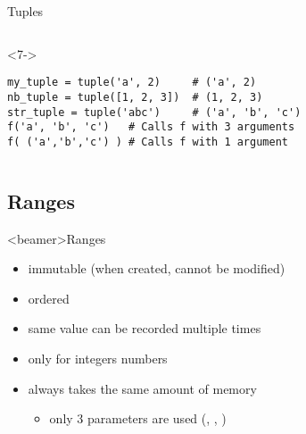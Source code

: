 \begin{frame}[fragile]{Tuples}
\begin{center}
\begin{columns}[onlytextwidth]
\begin{column}{\textwidth}
      \begin{onlyenv}<7->
        \begin{lstlisting}[style=python,morekeywords={for, in, range, list}]
my_tuple = tuple('a', 2)     # ('a', 2)
nb_tuple = tuple([1, 2, 3])  # (1, 2, 3)
str_tuple = tuple('abc')     # ('a', 'b', 'c')
f('a', 'b', 'c')   # Calls f with 3 arguments
f( ('a','b','c') ) # Calls f with 1 argument \end{lstlisting}
      \end{onlyenv}

    \end{column}
  \end{columns}

  \end{center}

\end{frame}



\subsection{Ranges}

\begin{frame}<beamer>{Ranges}

  \begin{itemize}
    \item<1-> immutable (when created, cannot be modified)
    \item<2-> ordered
    \item<3-> same value can be recorded multiple times
    \item<4-> only for integers numbers
    \item<5-> always takes the same amount of memory
    \begin{itemize}
      \item<6-> only 3 parameters are used (, , )
    \end{itemize}
  \end{itemize}

\end{frame}


